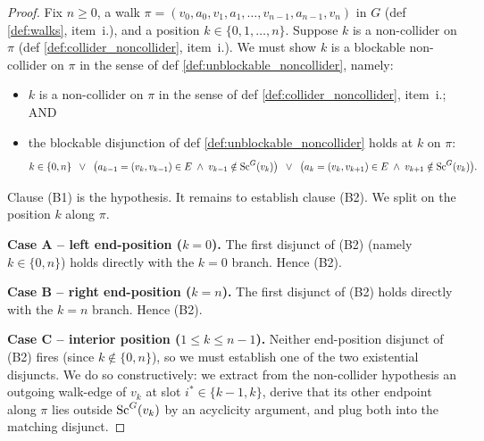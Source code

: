 \documentclass[main]{subfiles}
\begin{document}
\begin{proof}
Fix $n \ge 0$, a walk $\pi = (v_0, a_0, v_1, a_1, \dots, v_{n-1}, a_{n-1}, v_n)$ in $G$ (def \ref{def:walks}, item~i.), and a position $k \in \{0, 1, \dots, n\}$. Suppose $k$ is a non-collider on $\pi$ (def \ref{def:collider_noncollider}, item~i.). We must show $k$ is a blockable non-collider on $\pi$ in the sense of def \ref{def:unblockable_noncollider}, namely:
\begin{itemize}
    \item[(B1)] $k$ is a non-collider on $\pi$ in the sense of def \ref{def:collider_noncollider}, item~i.; AND
    \item[(B2)] the blockable disjunction of def \ref{def:unblockable_noncollider} holds at $k$ on $\pi$:
        \[
            k \in \{0, n\}
            \;\;\lor\;\;
            \bigl(a_{k-1} = (v_k, v_{k-1}) \in E \;\land\; v_{k-1} \notin \mathrm{Sc}^G(v_k)\bigr)
            \;\;\lor\;\;
            \bigl(a_k = (v_k, v_{k+1}) \in E \;\land\; v_{k+1} \notin \mathrm{Sc}^G(v_k)\bigr).
        \]
\end{itemize}
Clause (B1) is the hypothesis. It remains to establish clause (B2). We split on the position $k$ along $\pi$.

\medskip\noindent\textbf{Case A -- left end-position ($k = 0$).}
The first disjunct of (B2) (namely $k \in \{0, n\}$) holds directly with the $k = 0$ branch. Hence (B2).

\medskip\noindent\textbf{Case B -- right end-position ($k = n$).}
The first disjunct of (B2) holds directly with the $k = n$ branch. Hence (B2).

\medskip\noindent\textbf{Case C -- interior position ($1 \le k \le n - 1$).}
Neither end-position disjunct of (B2) fires (since $k \notin \{0, n\}$), so we must establish one of the two existential disjuncts. We do so constructively: we extract from the non-collider hypothesis an outgoing walk-edge of $v_k$ at slot $i^* \in \{k - 1, k\}$, derive that its other endpoint along $\pi$ lies outside $\mathrm{Sc}^G(v_k)$ by an acyclicity argument, and plug both into the matching disjunct.


\end{proof}
\end{document}
